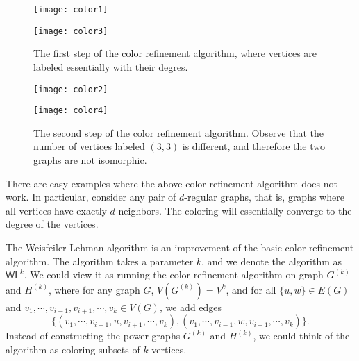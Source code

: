 \documentclass[a4paper,twoside,justified]{tufte-handout}
\begin{document}
\begin{figure}[t]
  \begin{multicols}{2}
    \begin{center}
      \texttt{[image: color1]}
    \end{center}
    \columnbreak
    \begin{center}
      \texttt{[image: color3]}
    \end{center}
  \end{multicols}
  \caption{The first step of the color refinement algorithm, where vertices are labeled essentially with their degres.}
  \label{fig:colorrefinementstep1}
\end{figure}

\begin{figure}[t]
  \begin{multicols}{2}
    \begin{center}
      \texttt{[image: color2]}
    \end{center}
    \columnbreak
    \begin{center}
      \texttt{[image: color4]}
    \end{center}
  \end{multicols}
  \caption{The second step of the color refinement algorithm. Observe that the number of vertices labeled $(3,3)$
  is different, and therefore the two graphs are not isomorphic.}
  \label{fig:colorrefinementstep2}
\end{figure}

There are easy examples where the above color refinement algorithm does not work. In particular, 
consider any pair of $d$-regular graphs, that is, graphs where all vertices have exactly $d$ neighbors.
The coloring will essentially converge to the degree of the vertices.

The Weisfeiler-Lehman algorithm is an improvement of the basic color refinement algorithm.
The algorithm takes a parameter $k$, and we denote the algorithm as $\textsf{WL}^k$.
We could view it as running the color refinement algorithm on graph $G^{(k)}$ and $H^{(k)}$, where
for any graph $G$, $V(G^{(k)})=V^k$, and for all $\{u,w\} \in E(G)$ and $v_1,\cdots,v_{i-1},v_{i+1},\cdots,v_k \in V(G)$, 
we add edges
\[
\{(v_1,\cdots,v_{i-1},u,v_{i+1},\cdots,v_k),(v_1,\cdots,v_{i-1},w,v_{i+1},\cdots,v_k)\}.
\]
Instead of constructing the power graphs $G^{(k)}$ and $H^{(k)}$, we could think of the algorithm as
coloring subsets of $k$ vertices. 
\end{document}
